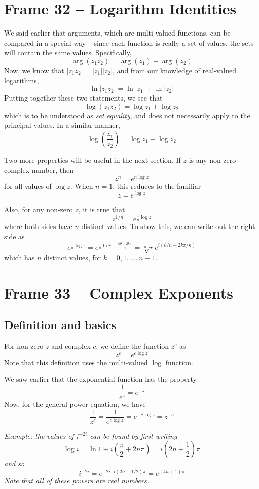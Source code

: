 \documentclass{article}
\begin{document}
\clearpage
\section{Frame 32 -- Logarithm Identities}
We said earlier that arguments, which are multi-valued functions, can be compared in a special way -- since each function is really a set of values, the sets will contain the same values. Specifically,
\[
	\arg(z_1 z_2) = \arg(z_1) + \arg(z_2)
\]
Now, we know that $|z_1z_2| = |z_1||z_2|$, and from our knowledge of real-valued logarithms,
\[
	\ln|z_1 z_2| = \ln|z_1| + \ln|z_2|
\]
Putting together these two statements, we see that
\[
	\log(z_1 z_2) = \log z_1 + \log z_2
\]
which is to be understood as \textit{set equality}, and does not necessarily apply to the principal values. In a similar manner,
\[
	\log \left( \frac{z_1}{z_2} \right) = \log z_1 - \log z_2
\]

Two more properties will be useful in the next section. If $z$ is any non-zero complex number, then
\[
	z^n = e^{n \log z}
\]
for all values of $\log z$. When $n = 1$, this reduces to the familiar
\[
	z = e^{\log z}
\]

Also, for any non-zero $z$, it is true that
\[
	z^{1 / n} = e^{\frac{1}{n} \log z}
\]
where both sides have $n$ distinct values. To show this, we can write out the right side as
\[
	e^{\frac{1}{n} \log z}
	= e^{\frac{1}{n} \ln r + \frac{i (\theta + 2k\pi}{n}}
	= \sqrt[n]{r} e^{i(\theta/n + 2k\pi/n)}
\]
which has $n$ distinct values, for $k = 0, 1, \dots, n - 1$.


\clearpage
\section{Frame 33 -- Complex Exponents}
\subsection{Definition and basics}
For non-zero $z$ and complex $c$, we define the function $z^c$ as
\[
	z^c = e^{c \log z}
\]
Note that this definition uses the multi-valued $\log$ function.

We saw earlier that the exponential function has the property
\[
	\frac{1}{e^z} = e^{-z}
\]
Now, for the general power equation, we have
\[
	\frac{1}{z^c} = \frac{1}{e^{c \log z}} = e^{-c \log z} = z^{-c}
\]

\textit{Example: the values of $i^{-2i}$ can be found by first writing
\[
	\log i = \ln 1 + i\left( \frac{\pi}{2} + 2n\pi\right)
	= i \left( 2n + \frac{1}{2} \right) \pi
\]
and so
\[
	i^{-2i} = e^{-2i \cdot i(2n + 1/2)\pi}
	= e^{(4n + 1) \pi}
\]
Note that all of these powers are real numbers.}
\end{document}

